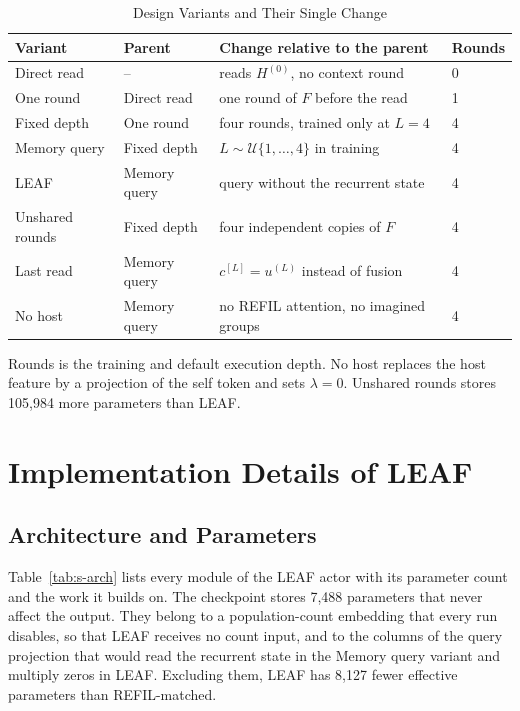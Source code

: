\begin{table}[!t]
\centering
\scriptsize
\setlength{\tabcolsep}{2.5pt}
\caption{Design Variants and Their Single Change}
\label{tab:s-variants}
\begin{tabular}{@{}llll@{}}
\toprule
Variant & Parent & Change relative to the parent & Rounds\\
\midrule
Direct read & -- & reads $H^{(0)}$, no context round & 0\\
One round & Direct read & one round of $F$ before the read & 1\\
Fixed depth & One round & four rounds, trained only at $L=4$ & 4\\
Memory query & Fixed depth & $L\sim\mathcal U\{1,\dots,4\}$ in training & 4\\
LEAF & Memory query & query without the recurrent state & 4\\
Unshared rounds & Fixed depth & four independent copies of $F$ & 4\\
Last read & Memory query & $c^{[L]}=u^{(L)}$ instead of fusion & 4\\
No host & Memory query & no REFIL attention, no imagined groups & 4\\
\bottomrule
\end{tabular}
\par\smallskip
\parbox{\columnwidth}{\scriptsize Rounds is the training and default execution depth. No host replaces the host feature by a projection of the self token and sets $\lambda=0$. Unshared rounds stores 105,984 more parameters than LEAF.}
\end{table}

\section{Implementation Details of LEAF}
\label{sec:s-leaf}

\subsection{Architecture and Parameters}
Table~\ref{tab:s-arch} lists every module of the LEAF actor with its parameter count and the work it builds on. The checkpoint stores 7,488 parameters that never affect the output. They belong to a population-count embedding that every run disables, so that LEAF receives no count input, and to the columns of the query projection that would read the recurrent state in the Memory query variant and multiply zeros in LEAF. Excluding them, LEAF has 8,127 fewer effective parameters than REFIL-matched.

